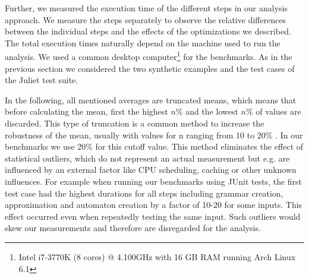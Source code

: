 Further, we measured the execution time of the different steps in our analysis approach. 
We measure the steps separately to observe the relative differences between the individual steps and the effects of the optimizations we described. The total execution times naturally depend on the machine used to run the analysis. We used a common desktop computer\footnote{Intel i7-3770K (8 cores) @ 4.100GHz with 16 GB RAM running Arch Linux 6.1} for the benchmarks.
As in the previous section we considered the two synthetic examples and the test cases of the Juliet test suite. 

In the following, all mentioned averages are truncated means, which means that before calculating the mean, first the highest $n\%$ and the lowest $n\%$ of values are discarded. This type of truncation is a common method to increase the robustness of the mean, usually with values for n ranging from 10 to 20\% \cite{krenel}. In our benchmarks we use 20\% for this cutoff value. This method eliminates the effect of statistical outliers, which do not represent an actual measurement but e.g. are influenced by an external factor like CPU scheduling, caching or other unknown influences. For example when running our benchmarks using JUnit tests, the first test case had the highest durations for all steps including grammar creation, approximation and automaton creation by a factor of 10-20 for some inputs. This effect occurred even when repeatedly testing the same input. Such outliers would skew our measurements and therefore are disregarded for the analysis.

